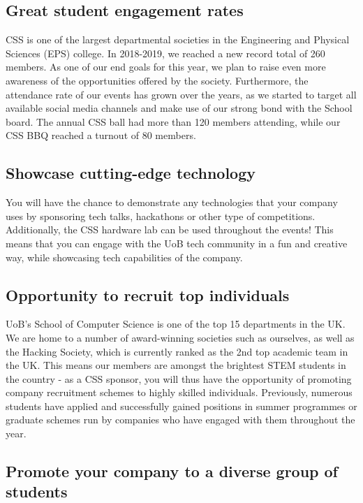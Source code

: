 \documentclass{article}
\begin{document}
\subsection*{Great student engagement rates}

CSS is one of the largest departmental societies in the Engineering and Physical Sciences (EPS) college. In 2018-2019, we reached a new record total of 260 members. As one of our end goals for this year, we plan to raise even more awareness of the opportunities offered by the society.
Furthermore, the attendance rate of our events has grown over the years, as we started to target all available social media channels and make use of our strong bond with the School board. 
The annual CSS ball had more than 120 members attending, while our CSS BBQ reached a turnout of 80 members.

\subsection*{Showcase cutting-edge technology}

You will have the chance to demonstrate any technologies that your company uses by sponsoring tech talks, hackathons or other type of competitions. Additionally, the CSS hardware lab can be used throughout the events! 
This means that you can engage with the UoB tech community in a fun and creative way, while showcasing tech capabilities of the company.

\subsection*{Opportunity to recruit top individuals}

UoB’s School of Computer Science is one of the top 15 departments in the UK. We are home to a number of award-winning societies such as ourselves, as well as the Hacking Society, which is currently ranked as the 2nd top academic team in the UK.
This means our members are amongst the brightest STEM students in the country - as a CSS sponsor, you will thus have the opportunity of promoting company recruitment schemes to highly skilled individuals.
Previously, numerous students have applied and successfully gained positions in summer programmes or graduate schemes run by companies who have engaged with them throughout the year. 

\subsection*{Promote your company to a diverse group of students}
\end{document}
